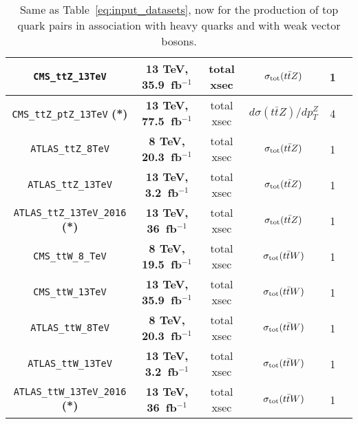 \begin{table}[t]
\begin{tabular}{c|c|c|c|c|c}
   {\tt CMS\_ttZ\_13TeV}  & {\bf 13 TeV, 35.9~fb$^{-1}$ }  & total xsec & $\sigma_{\rm tot}(t\bar{t}Z)$  &  1  &  \cite{Sirunyan:2017uzs}  \\
   \midrule
    {\tt CMS\_ttZ\_ptZ\_13TeV}  {\bf (*)} & {\bf 13 TeV, 77.5~fb$^{-1}$ }  & total xsec & $d\sigma(t\bar{t}Z)/dp_T^Z $  &  4  &  \cite{CMS:2019too}  \\
   \midrule
  {\tt ATLAS\_ttZ\_8TeV}  & {\bf 8 TeV, 20.3~fb$^{-1}$}  & total xsec & $\sigma_{\rm tot}(t\bar{t}Z)$  &  1  &  \cite{Aad:2015eua}  \\
    \midrule
        {\tt ATLAS\_ttZ\_13TeV}  & {\bf 13 TeV, 3.2~fb$^{-1}$}  & total xsec & $\sigma_{\rm tot}(t\bar{t}Z)$  &  1  &  \cite{Aaboud:2016xve}  \\
     \midrule
   {\tt ATLAS\_ttZ\_13TeV\_2016} {\bf (*)} & {\bf 13 TeV, 36~fb$^{-1}$}  & total xsec & $\sigma_{\rm tot}(t\bar{t}Z)$  &  1  &  \cite{Aaboud:2019njj}  \\
  \midrule
  \midrule
    {\tt CMS\_ttW\_8\_TeV}  & {\bf 8 TeV, 19.5~fb$^{-1}$}  & total xsec & $\sigma_{\rm tot}(t\bar{t}W)$  &  1  &  \cite{Khachatryan:2015sha}  \\ \midrule
     {\tt CMS\_ttW\_13TeV}  & {\bf 13 TeV, 35.9~fb$^{-1}$}  & total xsec & $\sigma_{\rm tot}(t\bar{t}W)$  &  1  &  \cite{Sirunyan:2017uzs}  \\
   \midrule
   {\tt ATLAS\_ttW\_8TeV}  & {\bf 8 TeV, 20.3~fb$^{-1}$}  & total xsec & $\sigma_{\rm tot}(t\bar{t}W)$  &  1  &  \cite{Aad:2015eua}  \\
    \midrule
   {\tt ATLAS\_ttW\_13TeV}  & {\bf 13 TeV, 3.2~fb$^{-1}$}  & total xsec & $\sigma_{\rm tot}(t\bar{t}W)$  &  1  &  \cite{Aaboud:2016xve}  \\
     \midrule
   {\tt ATLAS\_ttW\_13TeV\_2016} {\bf (*) } & {\bf 13 TeV, 36~fb$^{-1}$} & total xsec & $\sigma_{\rm tot}(t\bar{t}W)$  &  1  &  \cite{Aaboud:2019njj}  \\
\bottomrule
  \end{tabular}
  \caption{\small Same as Table~\ref{eq:input_datasets}, now for the production
    of top quark pairs in association with
    heavy quarks and with weak vector bosons.
     \label{eq:input_datasets2}
  }
\end{table}

